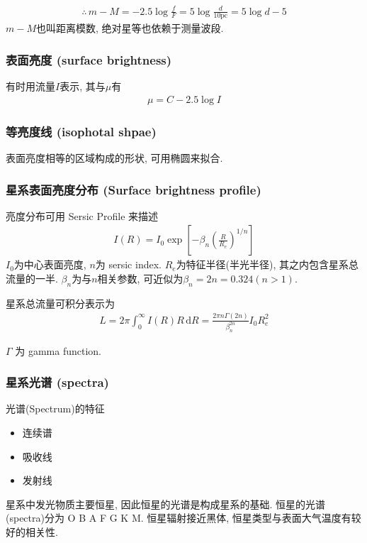 \begin{align*}
    \therefore \,m-M=-2.5\log\frac{f}{F}=5\log \frac{d}{10 \mathrm{pc}}=5\log d - 5 
\end{align*}
$m-M$也叫距离模数, 绝对星等也依赖于测量波段. 

\subsubsection{表面亮度 (surface brightness)}
有时用流量$I$表示, 其与$\mu$有
\begin{align*}
    \mu=C-2.5\log I
\end{align*}

\subsubsection{等亮度线 (isophotal shpae)}
表面亮度相等的区域构成的形状, 可用椭圆来拟合. 

\subsubsection{星系表面亮度分布 (Surface brightness profile)}
亮度分布可用 Sersic Profile 来描述
\begin{align*}
    I(R)=I_0 \exp\left[ -\beta_n\left( \frac{R}{R_e} \right)^{1/n} \right]
\end{align*}
$I_0$为中心表面亮度, $n$为 sersic index. $R_e$为特征半径(半光半径), 其之内包含星系总流量的一半. $\beta_n$为与$n$相关参数, 可近似为$\beta_n=2n=0.324 (n>1)$. 

星系总流量可积分表示为
\begin{align*}
    L=2\pi \int_{0}^{\infty}I(R)R\,\mathrm{d}R=\frac{2\pi n \Gamma (2n)}{\beta_n^{2n}}I_0 R_e^2
\end{align*}

$\Gamma$ 为 gamma function. 

\subsubsection{星系光谱 (spectra)}
光谱(Spectrum)的特征
\begin{itemize}
    \item 连续谱
    \item 吸收线
    \item 发射线
\end{itemize}

星系中发光物质主要恒星, 因此恒星的光谱是构成星系的基础. 恒星的光谱(spectra)分为 O B A F G K M. 恒星辐射接近黑体, 恒星类型与表面大气温度有较好的相关性. 

